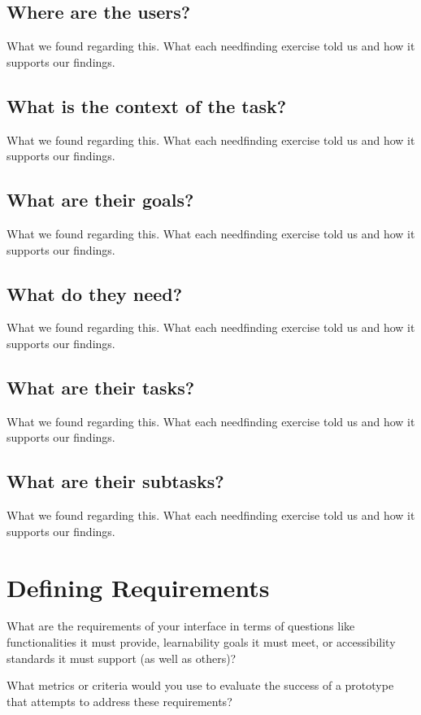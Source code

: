 \subsection{Where are the users?}
What we found regarding this. What each needfinding exercise told us and how it supports our findings.

\subsection{What is the context of the task?}
What we found regarding this. What each needfinding exercise told us and how it supports our findings.

\subsection{What are their goals?}
What we found regarding this. What each needfinding exercise told us and how it supports our findings.

\subsection{What do they need?}
What we found regarding this. What each needfinding exercise told us and how it supports our findings.

\subsection{What are their tasks?}
What we found regarding this. What each needfinding exercise told us and how it supports our findings.

\subsection{What are their subtasks?}
What we found regarding this. What each needfinding exercise told us and how it supports our findings.


\section{Defining Requirements}
What are the requirements of your interface in terms of questions like functionalities it must provide, learnability goals it must meet, or accessibility standards it must support (as well as others)?

What metrics or criteria would you use to evaluate the success of a prototype that attempts to address these requirements?

